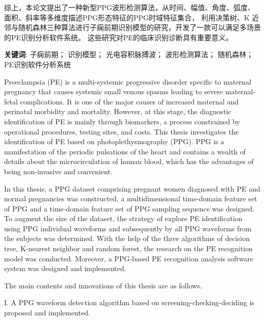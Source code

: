 综上，本论文提出了一种新型PPG波形检测算法，从时间、幅值、角度、弧度、面积、斜率等多维度描述PPG形态特征的PPG时域特征集合，
利用决策树、K 近邻与随机森林三种算法进行子痫前期识别模型的研究，开发了一款可以满足多场景的PE识别分析软件系统。
这些研究对PE的临床识别诊断具有重要意义。

\vspace{2em}

\textbf{关键词}: 子痫前期； 识别模型； 光电容积脉搏波； 波形检测算法； 随机森林；PE识别软件分析系统


\cleardoublepage
{}

Preeclampsia (PE) is a multi-systemic progressive disorder specific to maternal pregnancy that causes systemic small venous spasms 
leading to severe maternal-fetal complications. It is one of the major causes of increased maternal and perinatal morbidity and mortality.  
However, at this stage, the diagnostic identification of PE is mainly through biomarkers, a process constrained by operational procedures, 
testing sites, and costs. 
This thesis investigates the identification of PE based on photoplethysmography (PPG). PPG is a manifestation of the periodic pulsations 
of the heart and contains a wealth of details about the microcirculation of human blood, which has the advantages of being non-invasive and convenient.

In this thesis, a PPG dataset comprising pregnant women diagnosed with PE and normal pregnancies was constructed, 
a multidimensional time-domain feature set of PPG and a time-domain feature set of PPG sampling sequence was designed.
To augment the size of the dataset, the strategy of explore PE identification using PPG individual waveforms and subsequently 
by all PPG waveforms from the subjects was determined.
With the help of the three algorithms of decision tree, K-nearest neighbor and random forest, 
the research on the PE recognition model was conducted. Moreover, a PPG-based PE recognition analysis software 
system was designed and implemented.

The main contents and innovations of this thesis are as follows.

I. A PPG waveform detection algorithm based on screening-checking-deciding is proposed and implemented.

